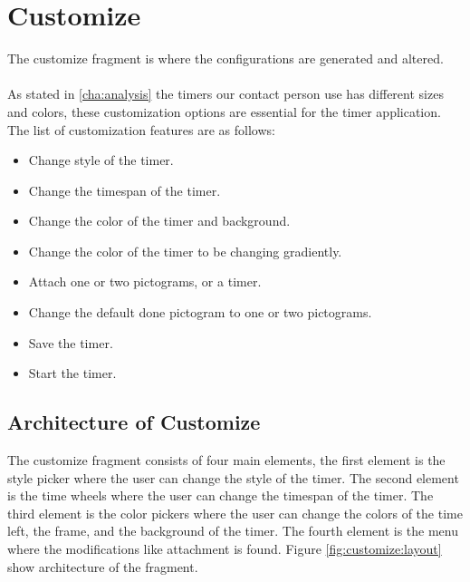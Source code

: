 \section{Customize}
The customize fragment is where the configurations are generated and altered.\\
\\
As stated in \autoref{cha:analysis} the timers our contact person use has different sizes and colors, these customization options are essential for the timer application.
The list of customization features are as follows:

\begin{itemize}
	\item Change style of the timer.
	\item Change the timespan of the timer.
	\item Change the color of the timer and background.
	\item Change the color of the timer to be changing gradiently.
	\item Attach one or two pictograms, or a timer.
	\item Change the default done pictogram to one or two pictograms.
	\item Save the timer.
	\item Start the timer.
\end{itemize}

\subsection{Architecture of Customize}
The customize fragment consists of four main elements, the first element is the style picker where the user can change the style of the timer.
The second element is the time wheels where the user can change the timespan of the timer.
The third element is the color pickers where the user can change the colors of the time left, the frame, and the background of the timer.
The fourth element is the menu where the modifications like attachment is found.
Figure \ref{fig:customize:layout} show architecture of the fragment.

